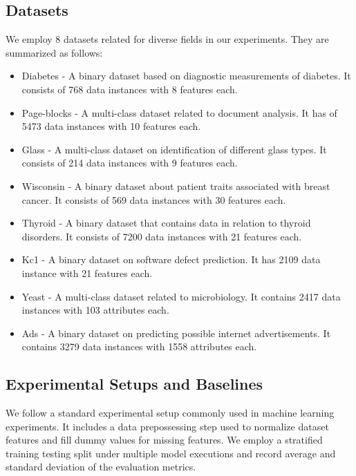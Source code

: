 \subsection{Datasets}
We employ 8 datasets related for diverse fields in our experiments. They are summarized as follows:

\begin{itemize}
    \item Diabetes \cite{smith1988using} - A binary dataset based on diagnostic measurements of diabetes. It consists of 768 data instances with 8 features each.
    \item Page-blocks \cite{fernandez2008study} - A multi-class dataset related to document analysis. It has of 5473 data instances with 10 features each.
    \item Glass \cite{dong2011new} - A multi-class dataset on identification of different glass types. It consists of 214 data instances with 9 features each.
    \item Wisconsin \cite{street1993nuclear} - A binary dataset about patient traits associated with breast cancer. It consists of 569 data instances with 30 features each.
    \item Thyroid \cite{pang2019deep} - A binary dataset that contains data in relation to thyroid disorders. It consists of 7200 data instances with 21 features each.
    \item  Kc1 \cite{menzies2004assessing} - A binary dataset on software defect prediction. It has 2109 data instance with 21 features each.
    \item Yeast \cite{read2011classifier} - A multi-class dataset related to microbiology. It contains 2417 data instances with 103 attributes each.
    \item Ads \cite{das2018sparse} - A binary dataset on predicting possible internet advertisements. It contains 3279 data instances with 1558 attributes each.
\end{itemize}

\subsection{Experimental Setups and Baselines}

We follow a standard experimental setup commonly used in machine learning experiments. It includes a data prepossessing step used to normalize dataset features and fill dummy values for missing features. We employ a stratified training testing split under multiple model executions and record average and standard deviation of the evaluation metrics. 

